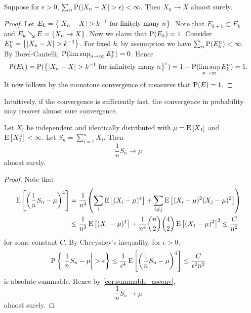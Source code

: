 \begin{corollary}\label{cor:summable_asconv}
    Suppose for $\epsilon>0$, $\sum_n \P(\abs{X_n-X}>\epsilon)<\infty$. Then 
    $X_n\to X$ almost surely. 
\end{corollary}
\begin{proof}
    Let $E_k = \set{\abs{X_n-X}> k^{-1}\text{ for finitely many }n}$. Note that 
    $E_{k+1}\subset E_k$ and $E_k\searrow E = \set{X_n\to X}$. Now we claim that 
    $\P(E_k) = 1$. Consider $E_k^n = \set{\abs{X_n-X}>k^{-1}}$. For fixed $k$, 
    by assumption we have $\sum_{n}\P(E_k^n)<\infty$. By Borel-Cantelli, 
    $\P(\limsup_{n\to\infty}E_k^n) = 0$. Hence 
    \begin{equation*}
        \P(E_k) = \P(\set{\abs{X_n-X}>k^{-1}\text{ for infinitely many }n}^c) 
        = 1 - \P(\limsup_{n\to\infty}E_k^n) = 1.
    \end{equation*}
    It now follows by the monotone convergence of measures that $\P(E) = 1$. 
\end{proof}
\begin{remark}
    Intuitively, if the convergence is sufficiently fast, the convergence in 
    probability may recover almost sure convergence. 
\end{remark}

\begin{theorem}
    Let $X_i$ be independent and identically distributed with $\mu = \E\sbrc{X_1}$ 
    and $\E\sbrc{X_1^4}<\infty$. Let $S_n = \sum_{i=1}^nX_i$. Then 
    \begin{equation*}
        \frac{1}{n}S_n\to\mu
    \end{equation*}
    almost surely. 
\end{theorem}
\begin{proof}
    Note that 
    \begin{equation*}
        \begin{split}
            \E\sbrc{\pth{\frac{1}{n}S_n - \mu}^4} &= \frac{1}{n^4}\pth{\sum_i \E\sbrc{(X_i-\mu)^4} + \sum_{i\neq j}\E\sbrc{(X_i-\mu)^2(X_j-\mu)^2}} \\
            &\leq \frac{1}{n^3}\E\sbrc{(X_1-\mu)^4} + \frac{1}{n^4}\binom{n}{2}\binom{4}{2}\E\sbrc{(X_1-\mu)^2}^2 \leq \frac{C}{n^2}
        \end{split}
    \end{equation*}
    for some constant $C$. By Checyshev's inequality, for $\epsilon>0$, 
    \begin{equation*}
        \P\set{\abs{\frac{1}{n}S_n - \mu}>\epsilon} \leq \frac{1}{\epsilon^4}\E\sbrc{\pth{\frac{1}{n}S_n - \mu}^4}\leq\frac{C}{\epsilon^2n^2}
    \end{equation*}
    is absolute summable. Hence by \cref{cor:summable_asconv}, 
    \begin{equation*}
        \frac{1}{n}S_n\to \mu
    \end{equation*}
    almost surely. 
\end{proof}

